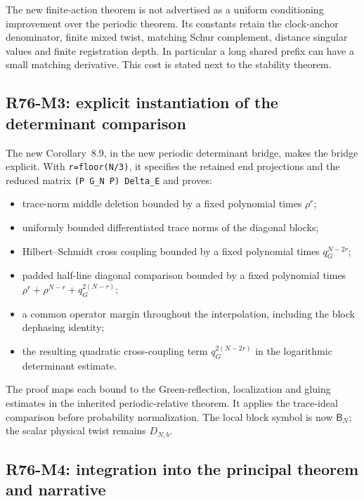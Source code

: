 \documentclass[
  11pt,
]{article}
\providecommand{\tightlist}{%
  \setlength{\itemsep}{0pt}\setlength{\parskip}{0pt}}
\begin{document}
The new finite-action theorem is not advertised as a uniform
conditioning improvement over the periodic theorem. Its constants retain
the clock-anchor denominator, finite mixed twist, matching Schur
complement, distance singular values and finite registration depth. In
particular a long shared prefix can have a small matching derivative.
This cost is stated next to the stability theorem.

\subsection{R76-M3: explicit instantiation of the determinant
comparison}\label{r76-m3-explicit-instantiation-of-the-determinant-comparison}

The new Corollary~8.9, in the new periodic
determinant bridge, makes the bridge explicit. With
\texttt{r=floor(N/3)}, it specifies the retained end projections and the
reduced matrix \texttt{(P\ G\_N\ P)\ Delta\_E} and proves:

\begin{itemize}
\tightlist
\item
  trace-norm middle deletion bounded by a fixed polynomial times
  \(\rho^r\);
\item
  uniformly bounded differentiated trace norms of the diagonal blocks;
\item
  Hilbert--Schmidt cross coupling bounded by a fixed polynomial times
  \(q_G^{N-2r}\);
\item
  padded half-line diagonal comparison bounded by a fixed polynomial
  times \(\rho^r+\rho^{N-r}+q_G^{2(N-r)}\);
\item
  a common operator margin throughout the interpolation, including the
  block dephasing identity;
\item
  the resulting quadratic cross-coupling term \(q_G^{2(N-2r)}\)
  in the logarithmic determinant estimate.
\end{itemize}

The proof maps each bound to the Green-reflection, localization and
gluing estimates in the inherited periodic-relative theorem. It applies
the trace-ideal comparison before probability normalization. The local
block symbol is now \(\mathsf B_N\); the scalar physical twist
remains \(D_{N,b}\).

\subsection{R76-M4: integration into the principal theorem and
narrative}\label{r76-m4-integration-into-the-principal-theorem-and-narrative}
\end{document}
